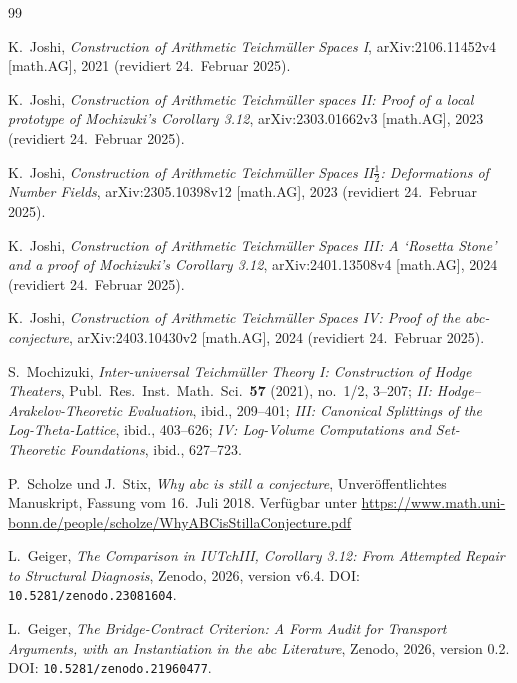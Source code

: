 \documentclass[11pt,a4paper]{article}
\begin{document}


\begin{thebibliography}{99}
\small
\raggedright
\sloppy
\setlength{\itemsep}{2pt plus 0.5pt minus 0.5pt}

K.~Joshi,
\emph{Construction of Arithmetic Teichmüller Spaces I},
arXiv:2106.11452v4 [math.AG], 2021 (revidiert 24.~Februar 2025).

K.~Joshi,
\emph{Construction of Arithmetic Teichmüller spaces II: Proof of a local
prototype of Mochizuki's Corollary 3.12},
arXiv:2303.01662v3 [math.AG], 2023 (revidiert 24.~Februar 2025).

K.~Joshi,
\emph{Construction of Arithmetic Teichmüller Spaces II$\frac{1}{2}$:
Deformations of Number Fields},
arXiv:2305.10398v12 [math.AG], 2023 (revidiert 24.~Februar 2025).

K.~Joshi,
\emph{Construction of Arithmetic Teichmüller Spaces III: A `Rosetta Stone'
and a proof of Mochizuki's Corollary 3.12},
arXiv:2401.13508v4 [math.AG], 2024 (revidiert 24.~Februar 2025).

K.~Joshi,
\emph{Construction of Arithmetic Teichmüller Spaces IV: Proof of the
abc-conjecture},
arXiv:2403.10430v2 [math.AG], 2024 (revidiert 24.~Februar 2025).

S.~Mochizuki,
\emph{Inter-universal Teichmüller Theory I: Construction of Hodge
Theaters}, Publ.\ Res.\ Inst.\ Math.\ Sci.\ \textbf{57} (2021), no.~1/2,
3--207;
\emph{II: Hodge--Arakelov-Theoretic Evaluation}, ibid., 209--401;
\emph{III: Canonical Splittings of the Log-Theta-Lattice}, ibid., 403--626;
\emph{IV: Log-Volume Computations and Set-Theoretic Foundations},
ibid., 627--723.

P.~Scholze und J.~Stix,
\emph{Why abc is still a conjecture},
Unveröffentlichtes Manuskript, Fassung vom 16.~Juli 2018.
Verfügbar unter
\url{https://www.math.uni-bonn.de/people/scholze/WhyABCisStillaConjecture.pdf}

L.~Geiger,
\emph{The Comparison in IUTchIII, Corollary 3.12: From Attempted Repair
to Structural Diagnosis},
Zenodo, 2026, version v6.4.
DOI: \nolinkurl{10.5281/zenodo.23081604}.

L.~Geiger,
\emph{The Bridge-Contract Criterion: A Form Audit for Transport Arguments,
with an Instantiation in the abc Literature},
Zenodo, 2026, version 0.2.
DOI: \nolinkurl{10.5281/zenodo.21960477}.


\end{thebibliography}
\end{document}
